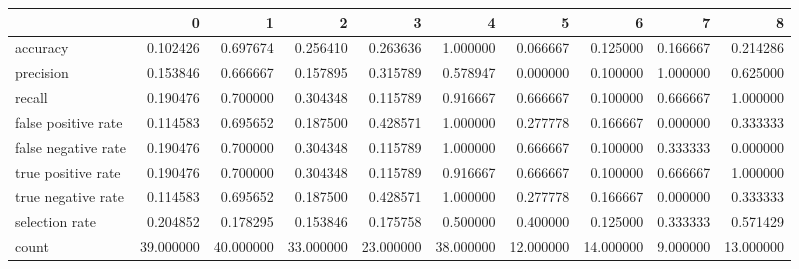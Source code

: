 \begin{tabular}{lrrrrrrrrr}
\toprule
{} &          0 &          1 &          2 &          3 &          4 &          5 &          6 &         7 &          8 \\
\midrule
accuracy            &   0.102426 &   0.697674 &   0.256410 &   0.263636 &   1.000000 &   0.066667 &   0.125000 &  0.166667 &   0.214286 \\
precision           &   0.153846 &   0.666667 &   0.157895 &   0.315789 &   0.578947 &   0.000000 &   0.100000 &  1.000000 &   0.625000 \\
recall              &   0.190476 &   0.700000 &   0.304348 &   0.115789 &   0.916667 &   0.666667 &   0.100000 &  0.666667 &   1.000000 \\
false positive rate &   0.114583 &   0.695652 &   0.187500 &   0.428571 &   1.000000 &   0.277778 &   0.166667 &  0.000000 &   0.333333 \\
false negative rate &   0.190476 &   0.700000 &   0.304348 &   0.115789 &   1.000000 &   0.666667 &   0.100000 &  0.333333 &   0.000000 \\
true positive rate  &   0.190476 &   0.700000 &   0.304348 &   0.115789 &   0.916667 &   0.666667 &   0.100000 &  0.666667 &   1.000000 \\
true negative rate  &   0.114583 &   0.695652 &   0.187500 &   0.428571 &   1.000000 &   0.277778 &   0.166667 &  0.000000 &   0.333333 \\
selection rate      &   0.204852 &   0.178295 &   0.153846 &   0.175758 &   0.500000 &   0.400000 &   0.125000 &  0.333333 &   0.571429 \\
count               &  39.000000 &  40.000000 &  33.000000 &  23.000000 &  38.000000 &  12.000000 &  14.000000 &  9.000000 &  13.000000 \\
\bottomrule
\end{tabular}
